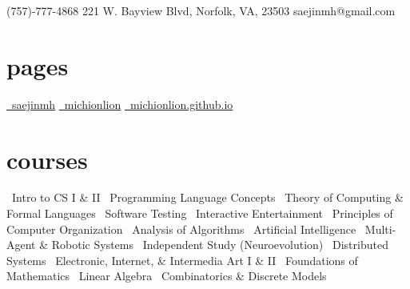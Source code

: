 \documentclass[]{friggeri-cv}
\begin{document}
       {\faMobilePhone\hspace{1mm}(757)-777-4868 \hspace{1cm} 221 W. Bayview Blvd, Norfolk, VA, 23503 \hspace{1.5cm} \faEnvelope\hspace{1.5mm}saejinmh@gmail.com}

\begin{aside}
  \section{pages}\vspace{0.05cm}
    \href{https://www.linkedin.com/in/saejinmh}{\faLinkedin\ saejinmh}\vspace{0.03cm}
    \href{https://github.com/Michionlion}{\faGithub\ michionlion}\vspace{0.03cm}
    \href{https://michionlion.github.io}{\faGlobe\ michionlion.github.io}\vspace{0.03cm}
  \section{courses}\vspace{0.05cm}
	\bullet\ Intro to CS I \& II\vspace{0.1cm}
	\bullet\ Programming Language Concepts\vspace{0.1cm}
	\bullet\ Theory of Computing \& Formal Languages\vspace{0.1cm}
	\bullet\ Software Testing\vspace{0.1cm}
	\bullet\ Interactive Entertainment\vspace{0.1cm}
	\bullet\ Principles of Computer Organization\vspace{0.1cm}
	\bullet\ Analysis of Algorithms\vspace{0.1cm}
	\bullet\ Artificial Intelligence\vspace{0.1cm}
	\bullet\ Multi-Agent \& Robotic Systems\vspace{0.1cm}
    \bullet\ Independent Study (Neuroevolution)\vspace{0.1cm}
    \bullet\ Distributed Systems\vspace{0.1cm}
    \bullet\ Electronic, Internet, \& Intermedia Art I \& II\vspace{0.1cm}
	\bullet\ Foundations of Mathematics\vspace{0.1cm}
	\bullet\ Linear Algebra\vspace{0.1cm}
	\bullet\ Combinatorics \& Discrete Models\vspace{0.1cm}

\end{aside}
\end{document}
